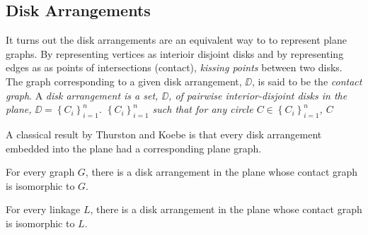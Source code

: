 \subsection{Disk Arrangements}
It turns out the disk arrangements are an equivalent way to to represent plane graphs.  By 
representing vertices as interioir disjoint disks and by representing edges as as points of 
intersections (contact), \textit{kissing 
points} between two disks.  The graph corresponding to a given disk arrangement, $\DD$, is said to 
be the \textit{contact graph}. A \it{disk arrangement} is a set, $\DD$, of pairwise 
interior-disjoint disks in the plane, 
$\DD=\left\lbrace C_i \right\rbrace_{i = 1}^n $.
$\left\lbrace C_i \right\rbrace_{i = 1}^n $ such that for any circle $C \in \left\lbrace C_i 
\right\rbrace_{i = 1}^n$, $C$


A classical result by Thurston and Koebe is that every disk arrangement embedded into the plane had 
a corresponding plane graph.
\begin{thm}\label{thm2-1}
For every graph $G$, there is a disk arrangement in the
plane whose contact graph is isomorphic to $G$.
\end{thm}

\begin{prop}
 For every linkage $L$, there is a disk arrangement in the
plane whose contact graph is isomorphic to $L$.
\end{prop}


